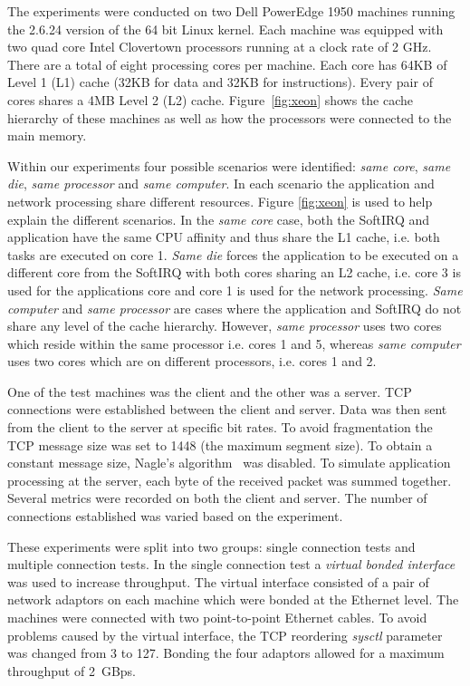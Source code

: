 \documentclass[conference, compsoc]{IEEEtran}
\begin{document}
The experiments were conducted on two Dell PowerEdge 1950 machines running the 2.6.24 version of the 64 bit Linux kernel. Each machine was equipped with two quad core Intel Clovertown processors running at a clock rate of 2 GHz. There are a total of eight processing cores per machine. Each core has 64KB of Level 1 (L1) cache (32KB for data and 32KB for instructions). Every pair of cores shares a 4MB Level 2 (L2) cache. Figure~\ref{fig:xeon} shows the cache hierarchy of these machines as well as how the processors were connected to the main memory.

Within our experiments four possible scenarios were identified: \emph{same core}, \emph{same die}, \emph{same processor} and \emph{same computer}. In each scenario the application and network processing share different resources. Figure \ref{fig:xeon} is used to help explain the different scenarios. In the \emph{same core} case, both the SoftIRQ and application have the same CPU affinity and thus share the L1 cache, i.e. both tasks are executed on core 1. \emph{Same die} forces the application to be executed on a different core from the SoftIRQ with both cores sharing an L2 cache, i.e. core 3 is used for the applications core and core 1 is used for the network processing. \emph{Same computer} and \emph{same processor} are cases where the application and SoftIRQ do not share any level of the cache hierarchy. However, \emph{same processor} uses two cores which reside within the same processor i.e. cores 1 and 5, whereas \emph{same computer} uses two cores which are on different processors, i.e. cores 1 and 2.

One of the test machines was the client and the other was a server. TCP connections were established between the client and server. Data was then sent from the client to the server at specific bit rates. To avoid fragmentation the TCP message size was set to 1448 (the maximum segment size). To obtain a constant message size, Nagle's algorithm~\cite{RFC0896} was disabled. To simulate application processing at the server, each byte of the received packet was summed together. Several metrics were recorded on both the client and server. The number of connections established was varied based on the experiment.

These experiments were split into two groups: single connection tests and multiple connection tests. In the single connection test a \emph{virtual bonded interface}~\cite{sterling95beowulf} was used to increase throughput. The virtual interface consisted of a pair of network adaptors on each machine which were bonded at the Ethernet level. The machines were connected with two point-to-point Ethernet cables. To avoid problems caused by the virtual interface, the TCP reordering \emph{sysctl} parameter was changed from 3 to 127. Bonding the four adaptors allowed for a maximum throughput of 2~GBps.
\end{document}
